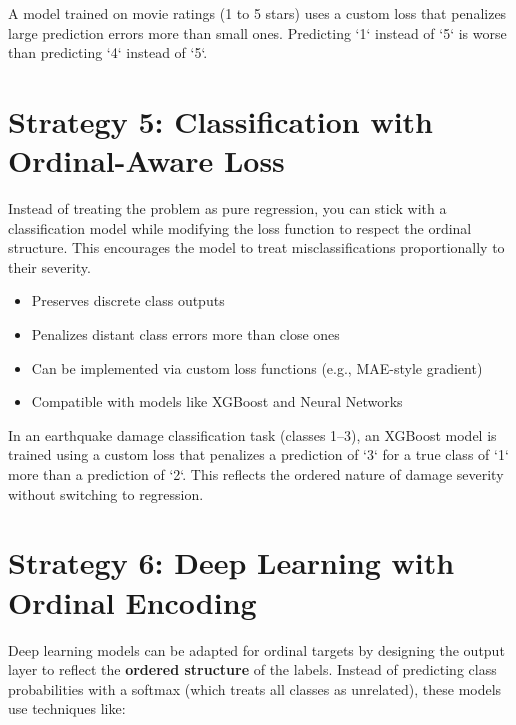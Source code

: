 \documentclass[12pt,openany, draft]{book}
\begin{document}
\begin{examplebox}
A model trained on movie ratings (1 to 5 stars) uses a custom loss that 
penalizes large prediction errors more than small ones. Predicting `1` 
instead of `5` is worse than predicting `4` instead of `5`.
\end{examplebox}

\vspace{5pt}



\section{Strategy 5: Classification with Ordinal-Aware Loss}

Instead of treating the problem as pure regression, you can stick with a classification model while modifying the loss function to respect the ordinal structure. This encourages the model to treat misclassifications proportionally to their severity.

\begin{itemize}
    \item Preserves discrete class outputs
    \item Penalizes distant class errors more than close ones
    \item Can be implemented via custom loss functions (e.g., MAE-style gradient)
    \item Compatible with models like XGBoost and Neural Networks
\end{itemize}

\begin{examplebox}
In an earthquake damage classification task (classes 1–3), an XGBoost model is trained using a custom loss that penalizes a prediction of `3` for a true class of `1` more than a prediction of `2`. This reflects the ordered nature of damage severity without switching to regression.
\end{examplebox}

\vspace{5pt}



\section{Strategy 6: Deep Learning with Ordinal Encoding}

Deep learning models can be adapted for ordinal targets by designing the output layer to reflect the \textbf{ordered structure} of the labels. Instead of predicting class probabilities with a softmax (which treats all classes as unrelated), these models use techniques like:
\end{document}
